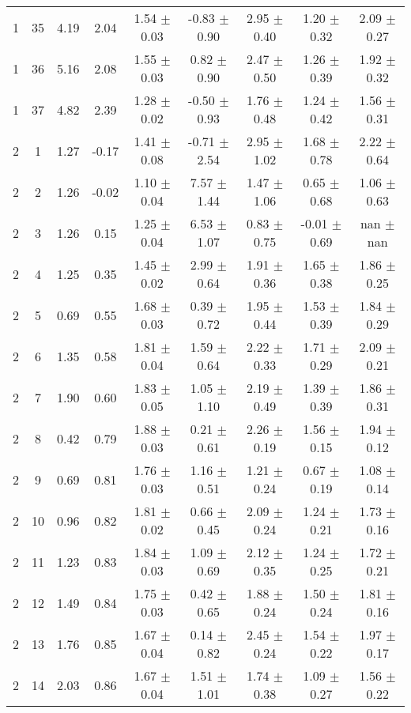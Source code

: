 \begin{landscape}
\begin{longtable}{ccccccccc}
   1 & 35 & 4.19 & 2.04 & 1.54 $\pm$ 0.03 & -0.83 $\pm$ 0.90 & 2.95 $\pm$ 0.40 & 1.20 $\pm$ 0.32 & 2.09 $\pm$ 0.27\\
   1 & 36 & 5.16 & 2.08 & 1.55 $\pm$ 0.03 & 0.82 $\pm$ 0.90 & 2.47 $\pm$ 0.50 & 1.26 $\pm$ 0.39 & 1.92 $\pm$ 0.32\\
   1 & 37 & 4.82 & 2.39 & 1.28 $\pm$ 0.02 & -0.50 $\pm$ 0.93 & 1.76 $\pm$ 0.48 & 1.24 $\pm$ 0.42 & 1.56 $\pm$ 0.31\\
 2 &  1 & 1.27 & -0.17 & 1.41 $\pm$ 0.08 & -0.71 $\pm$ 2.54 & 2.95 $\pm$ 1.02 & 1.68 $\pm$ 0.78 & 2.22 $\pm$ 0.64\\
 2 &  2 & 1.26 & -0.02 & 1.10 $\pm$ 0.04 & 7.57 $\pm$ 1.44 & 1.47 $\pm$ 1.06 & 0.65 $\pm$ 0.68 & 1.06 $\pm$ 0.63\\
   2 &  3 & 1.26 & 0.15 & 1.25 $\pm$ 0.04 & 6.53 $\pm$ 1.07 & 0.83 $\pm$ 0.75 & -0.01 $\pm$ 0.69 &  nan $\pm$  nan\\
   2 &  4 & 1.25 & 0.35 & 1.45 $\pm$ 0.02 & 2.99 $\pm$ 0.64 & 1.91 $\pm$ 0.36 & 1.65 $\pm$ 0.38 & 1.86 $\pm$ 0.25\\
   2 &  5 & 0.69 & 0.55 & 1.68 $\pm$ 0.03 & 0.39 $\pm$ 0.72 & 1.95 $\pm$ 0.44 & 1.53 $\pm$ 0.39 & 1.84 $\pm$ 0.29\\
   2 &  6 & 1.35 & 0.58 & 1.81 $\pm$ 0.04 & 1.59 $\pm$ 0.64 & 2.22 $\pm$ 0.33 & 1.71 $\pm$ 0.29 & 2.09 $\pm$ 0.21\\
   2 &  7 & 1.90 & 0.60 & 1.83 $\pm$ 0.05 & 1.05 $\pm$ 1.10 & 2.19 $\pm$ 0.49 & 1.39 $\pm$ 0.39 & 1.86 $\pm$ 0.31\\
   2 &  8 & 0.42 & 0.79 & 1.88 $\pm$ 0.03 & 0.21 $\pm$ 0.61 & 2.26 $\pm$ 0.19 & 1.56 $\pm$ 0.15 & 1.94 $\pm$ 0.12\\
   2 &  9 & 0.69 & 0.81 & 1.76 $\pm$ 0.03 & 1.16 $\pm$ 0.51 & 1.21 $\pm$ 0.24 & 0.67 $\pm$ 0.19 & 1.08 $\pm$ 0.14\\
   2 & 10 & 0.96 & 0.82 & 1.81 $\pm$ 0.02 & 0.66 $\pm$ 0.45 & 2.09 $\pm$ 0.24 & 1.24 $\pm$ 0.21 & 1.73 $\pm$ 0.16\\
   2 & 11 & 1.23 & 0.83 & 1.84 $\pm$ 0.03 & 1.09 $\pm$ 0.69 & 2.12 $\pm$ 0.35 & 1.24 $\pm$ 0.25 & 1.72 $\pm$ 0.21\\
   2 & 12 & 1.49 & 0.84 & 1.75 $\pm$ 0.03 & 0.42 $\pm$ 0.65 & 1.88 $\pm$ 0.24 & 1.50 $\pm$ 0.24 & 1.81 $\pm$ 0.16\\
   2 & 13 & 1.76 & 0.85 & 1.67 $\pm$ 0.04 & 0.14 $\pm$ 0.82 & 2.45 $\pm$ 0.24 & 1.54 $\pm$ 0.22 & 1.97 $\pm$ 0.17\\
   2 & 14 & 2.03 & 0.86 & 1.67 $\pm$ 0.04 & 1.51 $\pm$ 1.01 & 1.74 $\pm$ 0.38 & 1.09 $\pm$ 0.27 & 1.56 $\pm$ 0.22\\

\end{longtable}
\end{landscape}
